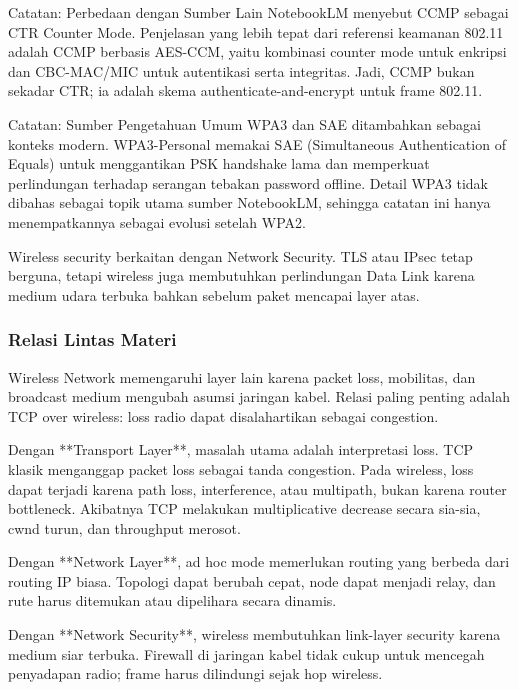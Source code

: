 \begin{cmt}{Catatan: Perbedaan dengan Sumber Lain}{}
NotebookLM menyebut CCMP sebagai CTR Counter Mode. Penjelasan yang lebih tepat dari referensi keamanan 802.11 adalah CCMP berbasis AES-CCM, yaitu kombinasi counter mode untuk enkripsi dan CBC-MAC/MIC untuk autentikasi serta integritas. Jadi, CCMP bukan sekadar CTR; ia adalah skema authenticate-and-encrypt untuk frame 802.11.
\end{cmt}

\begin{cmt}{Catatan: Sumber Pengetahuan Umum}{}
WPA3 dan SAE ditambahkan sebagai konteks modern. WPA3-Personal memakai SAE (Simultaneous Authentication of Equals) untuk menggantikan PSK handshake lama dan memperkuat perlindungan terhadap serangan tebakan password offline. Detail WPA3 tidak dibahas sebagai topik utama sumber NotebookLM, sehingga catatan ini hanya menempatkannya sebagai evolusi setelah WPA2.
\end{cmt}

Wireless security berkaitan dengan Network Security. TLS atau IPsec tetap berguna, tetapi wireless juga membutuhkan perlindungan Data Link karena medium udara terbuka bahkan sebelum paket mencapai layer atas.

\subsubsection{Relasi Lintas Materi}
\begin{jawab}
Wireless Network memengaruhi layer lain karena packet loss, mobilitas, dan broadcast medium mengubah asumsi jaringan kabel. Relasi paling penting adalah TCP over wireless: loss radio dapat disalahartikan sebagai congestion.
\end{jawab}

Dengan **Transport Layer**, masalah utama adalah interpretasi loss. TCP klasik menganggap packet loss sebagai tanda congestion. Pada wireless, loss dapat terjadi karena path loss, interference, atau multipath, bukan karena router bottleneck. Akibatnya TCP melakukan multiplicative decrease secara sia-sia, cwnd turun, dan throughput merosot.

Dengan **Network Layer**, ad hoc mode memerlukan routing yang berbeda dari routing IP biasa. Topologi dapat berubah cepat, node dapat menjadi relay, dan rute harus ditemukan atau dipelihara secara dinamis.

Dengan **Network Security**, wireless membutuhkan link-layer security karena medium siar terbuka. Firewall di jaringan kabel tidak cukup untuk mencegah penyadapan radio; frame harus dilindungi sejak hop wireless.

